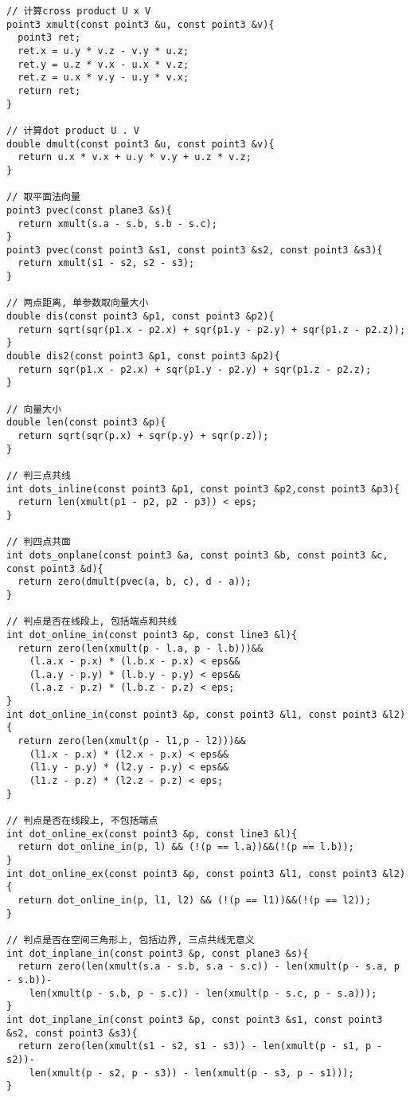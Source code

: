 \begin{lstlisting}[language={}]
// 计算cross product U x V
point3 xmult(const point3 &u, const point3 &v){
  point3 ret;
  ret.x = u.y * v.z - v.y * u.z;
  ret.y = u.z * v.x - u.x * v.z;
  ret.z = u.x * v.y - u.y * v.x;
  return ret;
}

// 计算dot product U . V
double dmult(const point3 &u, const point3 &v){
  return u.x * v.x + u.y * v.y + u.z * v.z;
}

// 取平面法向量
point3 pvec(const plane3 &s){
  return xmult(s.a - s.b, s.b - s.c);
}
point3 pvec(const point3 &s1, const point3 &s2, const point3 &s3){
  return xmult(s1 - s2, s2 - s3);
}

// 两点距离, 单参数取向量大小
double dis(const point3 &p1, const point3 &p2){
  return sqrt(sqr(p1.x - p2.x) + sqr(p1.y - p2.y) + sqr(p1.z - p2.z));
}
double dis2(const point3 &p1, const point3 &p2){
  return sqr(p1.x - p2.x) + sqr(p1.y - p2.y) + sqr(p1.z - p2.z);
}

// 向量大小
double len(const point3 &p){
  return sqrt(sqr(p.x) + sqr(p.y) + sqr(p.z));
}

// 判三点共线
int dots_inline(const point3 &p1, const point3 &p2,const point3 &p3){
  return len(xmult(p1 - p2, p2 - p3)) < eps;
}

// 判四点共面
int dots_onplane(const point3 &a, const point3 &b, const point3 &c, const point3 &d){
  return zero(dmult(pvec(a, b, c), d - a));
}

// 判点是否在线段上, 包括端点和共线
int dot_online_in(const point3 &p, const line3 &l){
  return zero(len(xmult(p - l.a, p - l.b)))&&
    (l.a.x - p.x) * (l.b.x - p.x) < eps&&
    (l.a.y - p.y) * (l.b.y - p.y) < eps&&
    (l.a.z - p.z) * (l.b.z - p.z) < eps;
}
int dot_online_in(const point3 &p, const point3 &l1, const point3 &l2){
  return zero(len(xmult(p - l1,p - l2)))&&
    (l1.x - p.x) * (l2.x - p.x) < eps&&
    (l1.y - p.y) * (l2.y - p.y) < eps&&
    (l1.z - p.z) * (l2.z - p.z) < eps;
}

// 判点是否在线段上, 不包括端点
int dot_online_ex(const point3 &p, const line3 &l){
  return dot_online_in(p, l) && (!(p == l.a))&&(!(p == l.b));
}
int dot_online_ex(const point3 &p, const point3 &l1, const point3 &l2){
  return dot_online_in(p, l1, l2) && (!(p == l1))&&(!(p == l2));
}

// 判点是否在空间三角形上, 包括边界, 三点共线无意义
int dot_inplane_in(const point3 &p, const plane3 &s){
  return zero(len(xmult(s.a - s.b, s.a - s.c)) - len(xmult(p - s.a, p - s.b))-
    len(xmult(p - s.b, p - s.c)) - len(xmult(p - s.c, p - s.a)));
}
int dot_inplane_in(const point3 &p, const point3 &s1, const point3 &s2, const point3 &s3){
  return zero(len(xmult(s1 - s2, s1 - s3)) - len(xmult(p - s1, p - s2))-
    len(xmult(p - s2, p - s3)) - len(xmult(p - s3, p - s1)));
}


\end{lstlisting}
